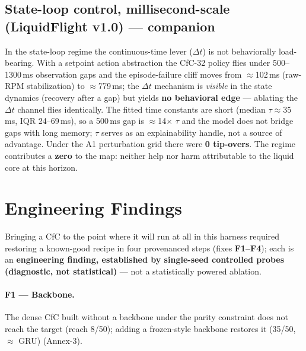 \documentclass[11pt]{article}
\begin{document}
\subsection{State-loop control, millisecond-scale (LiquidFlight v1.0) --- companion}
In the state-loop regime the continuous-time lever ($\Delta t$) is not behaviorally load-bearing. With a setpoint action abstraction the CfC-32 policy flies under 500--1300\,ms observation gaps and the episode-failure cliff moves from $\approx$102\,ms (raw-RPM stabilization) to $\approx$779\,ms; the $\Delta t$ mechanism is \emph{visible} in the state dynamics (recovery after a gap) but yields \textbf{no behavioral edge} --- ablating the $\Delta t$ channel flies identically. The fitted time constants are short (median $\tau \approx 35$\,ms, IQR 24--69\,ms), so a 500\,ms gap is $\approx$14$\times$ $\tau$ and the model does not bridge gaps with long memory; $\tau$ serves as an explainability handle, not a source of advantage. Under the A1 perturbation grid there were \textbf{0 tip-overs}. The regime contributes a \textbf{zero} to the map: neither help nor harm attributable to the liquid core at this horizon.

\section{Engineering Findings}\label{sec:eng}
Bringing a CfC to the point where it will run at all in this harness required restoring a known-good recipe in four provenanced steps (fixes \textbf{F1--F4}); each is an \textbf{engineering finding, established by single-seed controlled probes (diagnostic, not statistical)} --- not a statistically powered ablation.

\paragraph{F1 --- Backbone.} The dense CfC built without a backbone under the parity constraint does not reach the target (reach 8/50); adding a frozen-style backbone restores it (35/50, $\approx$ GRU) (Annex-3).
\end{document}
